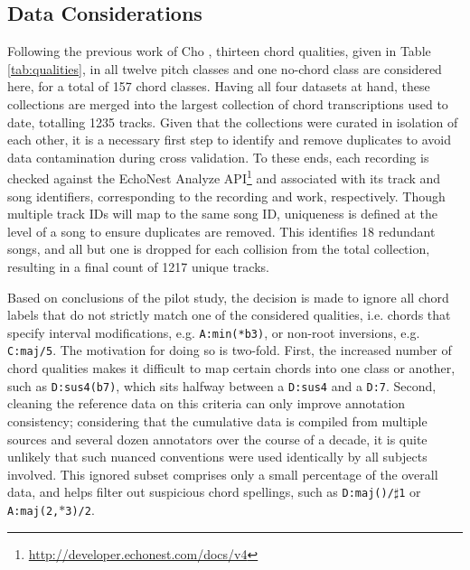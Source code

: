 \subsection{Data Considerations}
\label{subsec:data_considerations}
Following the previous work of Cho \cite{Cho2014}, thirteen chord qualities, given in Table \ref{tab:qualities}, in all twelve pitch classes and one no-chord class are considered here, for a total of 157 chord classes.
Having all four datasets at hand, these collections are merged into the largest collection of chord transcriptions used to date, totalling 1235 tracks.
Given that the collections were curated in isolation of each other, it is a necessary first step to identify and remove duplicates to avoid data contamination during cross validation.
To these ends, each recording is checked against the EchoNest Analyze API\footnote{\url{http://developer.echonest.com/docs/v4}} and associated with its track and song identifiers, corresponding to the recording and work, respectively.
Though multiple track IDs will map to the same song ID, uniqueness is defined at the level of a song to ensure duplicates are removed.
This identifies 18 redundant songs, and all but one is dropped for each collision from the total collection, resulting in a final count of 1217 unique tracks.

Based on conclusions of the pilot study, the decision is made to ignore all chord labels that do not strictly match one of the considered qualities, i.e. chords that specify interval modifications, e.g. \texttt{A:min(*b3)}, or non-root inversions, e.g. \texttt{C:maj/5}.
The motivation for doing so is two-fold.
First, the increased number of chord qualities makes it difficult to map certain chords into one class or another, such as \texttt{D:sus4(b7)}, which sits halfway between a \texttt{D:sus4} and a \texttt{D:7}.
Second, cleaning the reference data on this criteria can only improve annotation consistency; considering that the cumulative data is compiled from multiple sources and several dozen annotators over the course of a decade, it is quite unlikely that such nuanced conventions were used identically by all subjects involved.
This ignored subset comprises only a small percentage of the overall data, and helps filter out suspicious chord spellings, such as \texttt{D:maj()/$\sharp$1} or \texttt{A:maj(2,$\ast$3)/2}.

